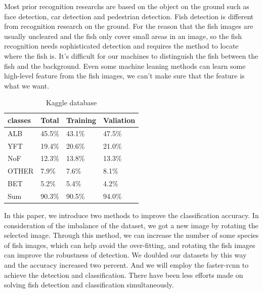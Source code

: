 \documentclass[conference]{IEEEtran}
\begin{document}
Most prior recognition researchs are based on the object on the ground such as face detection, car detection and pedestrian detection. Fish detection is different from recognition research on the ground. For the reason that the fish images are usually uncleared and the fish only cover small areas in an image, so the fish recognition needs sophisticated detection and requires the method to locate where the fish is. It's difficult for our machines to distinguish the fish between the fish and the background. Even some machine leaning methods can learn some high-level feature from the fish images, we can't make sure that the feature is what we want.

\begin{table}[t]
  \caption{Kaggle database}
  \label{table:table1}
  \centering
  \begin{tabular}{llll}
    \toprule
    \cmidrule{1-4}
    classes     & Total     & Training   &Valiation \\
    \hline
    ALB & 45.5\%  & 43.1\%  & 47.5\%     \\
    YFT     & 19.4\% & 20.6\%   &21.0\%    \\
    NoF     & 12.3\%   & 13.8\% &13.3\% \\
    OTHER & 7.9\% & 7.6\% & 8.1\% \\
    BET & 5.2\% & 5.4\% & 4.2\% \\ 
    \toprule 
    Sum & 90.3\% & 90.5\% & 94.0\% \\  
    \bottomrule
  \end{tabular}
\end{table}



In this paper, we introduce two methods to improve the classification accuracy. In consideration of the imbalance of the dataset, we got a new image by rotating the selected image. Through this method, we can increase the number of some species of fish images, which can help avoid the over-fitting, and rotating the fish images can improve the robustness of detection. We doubled our datasets by this way and the accuracy increased two percent. And we will employ the faster-rcnn to achieve the detection and classification. There have been less efforts made on solving fish detection and classification simultaneously\cite{qin2015deepfish}. \par
\end{document}
